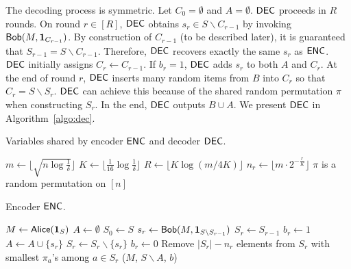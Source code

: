 The decoding process is symmetric.  Let $C_0=\emptyset$ and $A=\emptyset$.  $\textsf{DEC}$ proceeds in $R$ rounds.  On round $r\in[R]$, $\textsf{DEC}$ obtains $s_r\in S\backslash C_{r-1}$ by invoking $\mathsf{Bob}(M, \mathbf{1}_{C_{r-1}})$.  By construction of $C_{r-1}$ (to be described later), it is guaranteed that $S_{r-1}=S\backslash C_{r-1}$.  Therefore, $\textsf{DEC}$ recovers exactly the same $s_r$ as $\textsf{ENC}$.  $\textsf{DEC}$ initially assigns $C_r\leftarrow C_{r-1}$.  If $b_r=1$, $\textsf{DEC}$ adds $s_r$ to both $A$ and $C_r$.  At the end of round $r$, $\textsf{DEC}$ inserts many random items from $B$ into $C_r$ so that $C_r=S\backslash S_r$.  $\textsf{DEC}$ can achieve this because of the shared random permutation $\pi$ when constructing $S_r$.  In the end, $\textsf{DEC}$ outputs $B\cup A$.  We present $\textsf{DEC}$ in Algorithm~\ref{algo:dec}.

\begin{algorithm}[H] 
  \caption{Variables shared by encoder $\textsf{ENC}$ and decoder $\textsf{DEC}$.} \label{algo:para}
  \begin{algorithmic}[1] 
    \State $m\leftarrow \lfloor \sqrt{n \log\frac{1}{\delta}} \rfloor$ 
    \State $K\leftarrow \lfloor \frac{1}{16}\log \frac{1}{\delta} \rfloor$
    \State $R\leftarrow \lfloor K\log(m/4K) \rfloor$
      \State $n_r\leftarrow \lfloor m \cdot 2^{-\frac{r}{K}} \rfloor$ 
    \EndFor
    \State $\pi$ is a random permutation on $[n]$ 
  \end{algorithmic}
\end{algorithm}

\begin{algorithm}[H] 
  \caption{Encoder $\textsf{ENC}$.} \label{algo:enc}
  \begin{algorithmic}[1]
    \State $M \leftarrow \mathsf{Alice}(\mathbf{1}_S)$
    \State $A\leftarrow \emptyset$ 
    \State $S_0 \leftarrow S$ 
      \State $s_r\leftarrow \mathsf{Bob}(M, \mathbf{1}_{S\backslash S_{r-1}})$ 
      \State $S_r\leftarrow S_{r-1}$
       
        \State $b_r\leftarrow 1$ 
        \State $A\leftarrow A \cup \{s_r\}$
        \State $S_r\leftarrow S_r \backslash \{s_r\}$
      \Else 
        \State $b_r\leftarrow 0$
      \EndIf
      \State Remove $|S_r|-n_r$ elements from $S_r$ with smallest $\pi_a$'s among $a\in S_r$ 
    \EndFor
    \State \Return ($M$, $S\backslash A$, $b$) 
    \EndProcedure
  \end{algorithmic}
\end{algorithm}

